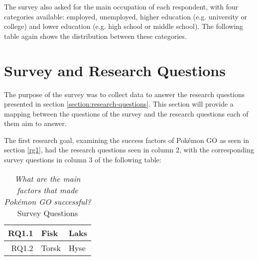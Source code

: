 
The survey also asked for the main occupation of each respondent, with four categories available: employed, unemployed, higher education (e.g. university or college) and lower education (e.g. high school or middle school). The following table again shows the distribution between these categories. 


\section{Survey and Research Questions}

The purpose of the survey was to collect data to answer the research questions presented in section \ref{section:research-questions}. This section will provide a mapping between the questions of the survey and the research questions each of them aim to answer.

The first research goal, examining the success factors of Pokémon GO as seen in section \ref{rg1}, had the research questions seen in column 2, with the corresponding survey questions in column 3 of the following table:

\begin{table}[h!]
	\caption{\emph{What are the main factors that made Pokémon GO successful?} Survey Questions}
	\centering
	\label{tab:rg1-survey-questions}
	\begin{tabular}{|rl|l|}
		\hline
		RQ1.1 & Fisk & Laks\\
		\hline
		RQ1.2 & Torsk & Hyse\\
		\hline
	\end{tabular}
\end{table}